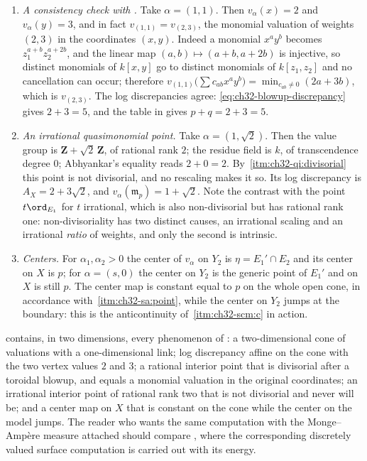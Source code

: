 \begin{example}
\begin{enumerate}
$\tfrac12\ord_{E_1}$ to $\tfrac13\ord_{E_2}$.
\item\label{itm:ch32-bs:consistency}
\emph{A consistency check with .}  Take
$\alpha=(1,1)$.  Then $v_\alpha(x)=2$ and $v_\alpha(y)=3$, and in fact
$v_{(1,1)}=v_{(2,3)}$, the monomial valuation of weights $(2,3)$ in the
coordinates $(x,y)$.  Indeed a monomial $x^ay^b$ becomes
$z_1^{a+b}z_2^{a+2b}$, and the linear map
$(a,b)\mapsto(a+b,a+2b)$ is injective, so distinct monomials of
$k[x,y]$ go to distinct monomials of $k[z_1,z_2]$ and no cancellation can
occur; therefore
$v_{(1,1)}\bigl(\sum c_{ab}x^ay^b\bigr)=\min_{c_{ab}\neq0}(2a+3b)$, which
is $v_{(2,3)}$.  The log discrepancies agree:
\eqref{eq:ch32-blowup-discrepancy} gives $2+3=5$, and the table in
 gives $p+q=2+3=5$.
\item\label{itm:ch32-bs:irrational}
\emph{An irrational quasimonomial point.}  Take
$\alpha=(1,\sqrt2)$.  Then the value group is
$\mathbf Z+\sqrt2\,\mathbf Z$, of rational rank $2$; the residue field is
$k$, of transcendence degree $0$; Abhyankar's equality reads
$2+0=2$.  By
\,\cref{itm:ch32-qi:divisorial} this
point is not divisorial, and no rescaling makes it so.  Its log discrepancy
is $A_X=2+3\sqrt2$, and
$v_\alpha(\mathfrak m_p)=1+\sqrt2$.  Note the contrast with the point
$t\ord_{E_1}$ for $t$ irrational, which is also non-divisorial but has
rational rank one: non-divisoriality has two distinct causes, an irrational
scaling and an irrational \emph{ratio} of weights, and only the second is
intrinsic.
\item\label{itm:ch32-bs:center}
\emph{Centers.}  For $\alpha_1,\alpha_2>0$ the center of $v_\alpha$ on
$Y_2$ is $\eta=E_1'\cap E_2$ and its center on $X$ is $p$; for
$\alpha=(s,0)$ the center on $Y_2$ is the generic point of $E_1'$ and
on $X$ is still $p$.  The center map is constant equal to $p$ on the
whole open cone, in accordance with
\,\cref{itm:ch32-sa:point}, while the center on
$Y_2$ jumps at the boundary: this is the anticontinuity of
\,\cref{itm:ch32-scm:c} in action.
\end{enumerate}
\end{example}

\begin{remark}
\label{rem:ch32-blowup-lessons}
 contains, in two dimensions, every phenomenon
of : a two-dimensional cone of valuations with
a one-dimensional link; log discrepancy affine on the cone with the two
vertex values $2$ and $3$; a rational interior point that is divisorial
after a toroidal blowup, and equals a monomial valuation in the original
coordinates; an irrational interior point of rational rank two that is not
divisorial and never will be; and a center map on $X$ that is constant on
the cone while the center on the model jumps.  The reader who wants the
same computation with the Monge--Amp\`ere measure attached should compare
, where the corresponding discretely valued
surface computation is carried out with its energy.
\end{remark}

